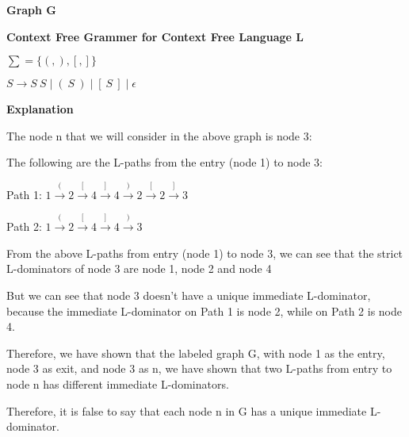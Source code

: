 \documentclass[12pt]{article}
\begin{document}
\begin{enumerate}
\begin{mdframed}
      \textbf{Graph G}


      \textbf{Context Free Grammer for Context Free Language L}

      $ \sum = \{(, ), [, ]\} $

      $ S \rightarrow S \: S \mid ( \: S \: ) \mid [ \: S \: ] \mid \epsilon $

      \textbf{Explanation}

      The node n that we will consider in the above graph is node 3:

      The following are the L-paths from the entry (node 1) to node 3:

      Path 1: $1 \xrightarrow{(} 2 \xrightarrow{[} 4 \xrightarrow{]} 4 \xrightarrow{)} 2 \xrightarrow{[} 2 \xrightarrow{]} 3$
      
      Path 2: $1 \xrightarrow{(} 2 \xrightarrow{[} 4 \xrightarrow{]} 4 \xrightarrow{)} 3$

      From the above L-paths from entry (node 1) to node 3, we can see that the strict L-dominators of node 3 are node 1, node 2 and node 4

      But we can see that node 3 doesn't have a unique immediate L-dominator, because the immediate L-dominator on Path 1 is node 2, while on Path 2 is node 4.

      Therefore, we have shown that the labeled graph G, with node 1 as the entry, node 3 as exit, and node 3 as n, we have shown that two L-paths from entry to node n has different immediate L-dominators.

      Therefore, it is false to say that each node n in G has a unique immediate L-dominator.
      \end{mdframed}
      
  \end{enumerate}
    
\end{document}
